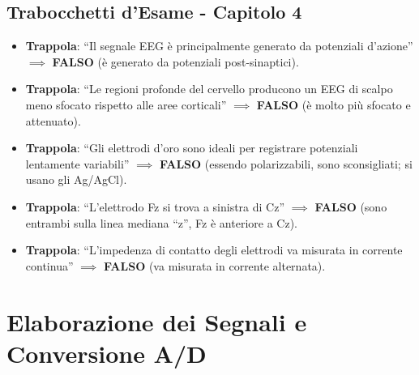 \documentclass[10pt, letterpaper]{report}
\begin{document}
\section*{Trabocchetti d'Esame - Capitolo 4}
\begin{itemize}
    \item \textbf{Trappola}: ``Il segnale EEG è principalmente generato da potenziali d'azione'' \(\implies\) \textbf{FALSO} (è generato da potenziali post-sinaptici).
    \item \textbf{Trappola}: ``Le regioni profonde del cervello producono un EEG di scalpo meno sfocato rispetto alle aree corticali'' \(\implies\) \textbf{FALSO} (è molto più sfocato e attenuato).
    \item \textbf{Trappola}: ``Gli elettrodi d'oro sono ideali per registrare potenziali lentamente variabili'' \(\implies\) \textbf{FALSO} (essendo polarizzabili, sono sconsigliati; si usano gli Ag/AgCl).
    \item \textbf{Trappola}: ``L'elettrodo Fz si trova a sinistra di Cz'' \(\implies\) \textbf{FALSO} (sono entrambi sulla linea mediana ``z'', Fz è anteriore a Cz).
    \item \textbf{Trappola}: ``L'impedenza di contatto degli elettrodi va misurata in corrente continua'' \(\implies\) \textbf{FALSO} (va misurata in corrente alternata).
\end{itemize}

\chapter{Elaborazione dei Segnali e Conversione A/D}
\end{document}
